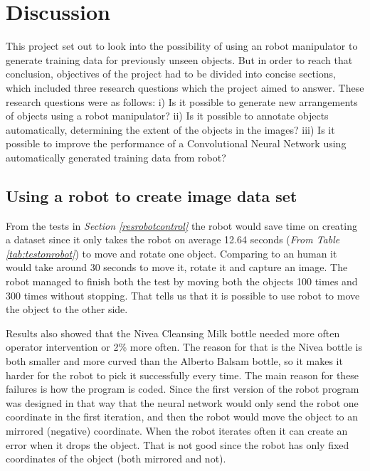\chapter{Discussion}
This project set out to look into the possibility of using an robot manipulator to generate training data for previously unseen objects. But in order to reach that conclusion, objectives of the project had to be divided into concise sections, which included three research questions which the project aimed to answer. These research questions were as follows: i) Is it possible to generate new arrangements of objects using a robot manipulator? ii) Is it possible to annotate objects automatically, determining the extent of the objects in the images? iii) Is it possible to improve the performance of a Convolutional Neural Network using automatically generated training data from robot?

\section{Using a robot to create image data set}
From the tests in \textit{Section \ref{resrobotcontrol}} the robot would save time on creating a dataset since it only takes the robot on average 12.64 seconds (\textit{From Table \ref{tab:testonrobot}}) to move and rotate one object. Comparing to an human it would take around 30 seconds to move it, rotate it and capture an image. The robot managed to finish both the test by moving both the objects 100 times and 300 times without stopping. That tells us that it is possible to use robot to move the object to the other side. 

Results also showed that the Nivea Cleansing Milk bottle needed more often operator intervention or 2\% more often. The reason for that is the Nivea bottle is both smaller and more curved than the Alberto Balsam bottle, so it makes it harder for the robot to pick it successfully every time. The main reason for these failures is how the program is coded. Since the first version of the robot program was designed in that way that the neural network would only send the robot one coordinate in the first iteration, and then the robot would move the object to an mirrored (negative) coordinate. When the robot iterates often it can create an error when it drops the object. That is not good since the robot has only fixed coordinates of the object (both mirrored and not).

